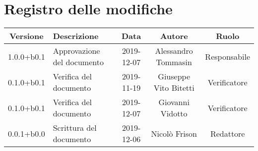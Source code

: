 \section*{Registro delle modifiche}

\begin{center}
	\begin{longtable}{|c|p{3cm}|c|c|c|}
	\hline
	\rowcolor{lighter-grayer}
	\textbf{Versione} & \textbf{Descrizione} & \textbf{Data} & \textbf{Autore} & \textbf{Ruolo} \\
	\hline
	\endfirsthead


	1.0.0+b0.1 & Approvazione del documento & 2019-12-07 & Alessandro Tommasin & Responsabile \\
	\hline
	0.1.0+b0.1 & Verifica del documento & 2019-11-19 & Giuseppe Vito Bitetti & Verificatore \\
	\hline
	0.1.0+b0.1 & Verifica del documento & 2019-12-07 & Giovanni Vidotto & Verificatore \\
	\hline
	0.0.1+b0.0 & Scrittura del documento & 2019-12-06 & Nicolò Frison & Redattore \\

	\hline

	\end{longtable}
\end{center}
